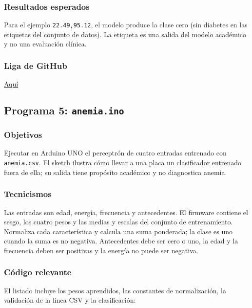 \documentclass{article}[12pt,a4paper]
\begin{document}
\subsubsection{Resultados esperados}

Para el ejemplo \texttt{22.49,95.12}, el modelo produce la clase cero (sin
diabetes en las etiquetas del conjunto de datos). La etiqueta es una salida del
modelo académico y no una evaluación clínica.

\subsubsection{Liga de \textbf{GitHub}}

\href{https://github.com/MarcosHCK/master-programming/tree/master/clase011}{Aquí \faGithubSquare}

\subsection{Programa 5: \texttt{anemia.ino}}

\subsubsection{Objetivos}

Ejecutar en Arduino UNO el perceptrón de cuatro entradas entrenado con
\texttt{anemia.csv}. El sketch ilustra cómo llevar a una placa un clasificador
entrenado fuera de ella; su salida tiene propósito académico y no diagnostica
anemia.

\subsubsection{Tecnicismos}

Las entradas son edad, energía, frecuencia y antecedentes. El firmware contiene
el sesgo, los cuatro pesos y las medias y escalas del conjunto de entrenamiento.
Normaliza cada característica y calcula una suma ponderada; la clase es uno
cuando la suma es no negativa. Antecedentes debe ser cero o uno, la edad y la
frecuencia deben ser positivas y la energía no puede ser negativa.

\subsubsection{Código relevante}

El listado incluye los pesos aprendidos, las constantes de normalización, la
validación de la línea CSV y la clasificación:
\end{document}
